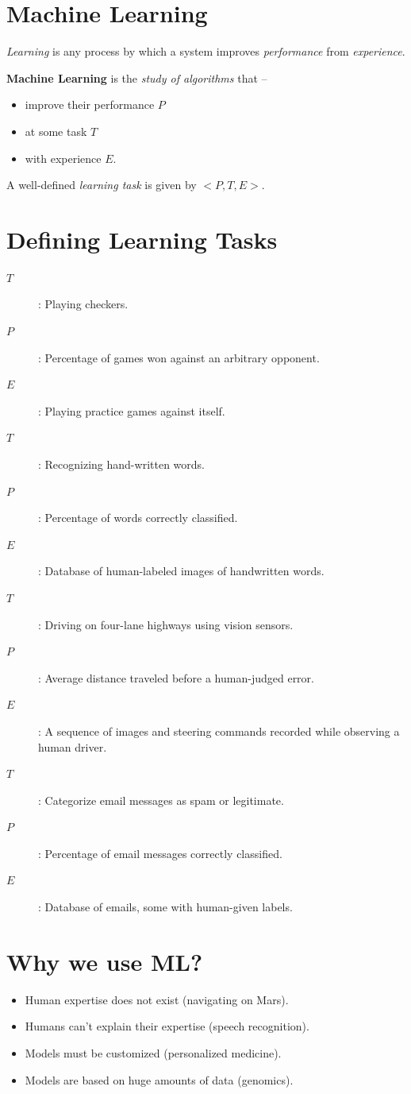 \documentclass[
	title={ML Fundamentals}
]{cs584notes}
\newcommand{\learningtask}[3]{%
	\begin{description}
		\item[$T$]: #1
		\item[$P$]: #2
		\item[$E$]: #3
	\end{description}
	\vspace*{0.25em}
}
\begin{document}

\section{Machine Learning}\label{sec:machine-learning}
\begin{displayquote}
	\emph{Learning} is any process by which a system improves \emph{performance} from \emph{experience}.
\end{displayquote}

\textbf{Machine Learning} is the \emph{study of algorithms} that --
\begin{itemize}
	\item improve their performance \emph{$P$}
	\item at some task \emph{$T$}
	\item with experience \emph{$E$}.
\end{itemize}
A well-defined \emph{learning task} is given by $<P,T,E>$.

\section{Defining Learning Tasks}\label{sec:defining-learning-tasks}
\learningtask{Playing checkers.}{Percentage of games won against an arbitrary opponent.}{Playing practice games against itself.}

\learningtask{Recognizing hand-written words.}{Percentage of words correctly classified.}{Database of human-labeled images of handwritten words.}

\learningtask{Driving on four-lane highways using vision sensors.}{Average distance traveled before a human-judged error.}{A sequence of images and steering commands recorded while observing a human driver.}

\learningtask{Categorize email messages as spam or legitimate.}{Percentage of email messages correctly classified.}{Database of emails, some with human-given labels.}

\section{Why we use ML?}\label{sec:why-we-use-ml?}
\begin{itemize}
	\item Human expertise does not exist (navigating on Mars).
	\item Humans can't explain their expertise (speech recognition).
	\item Models must be customized (personalized medicine).
	\item Models are based on huge amounts of data (genomics).
\end{itemize}
\end{document}
